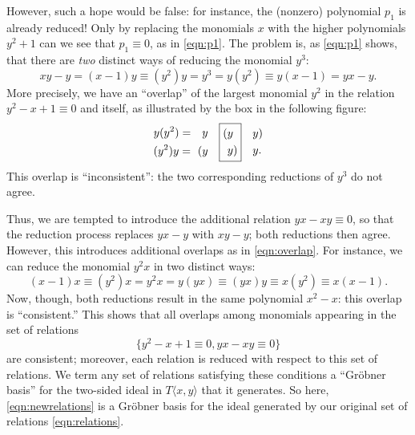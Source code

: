 However, such a hope would be false: for instance, the (nonzero) polynomial $p_1$ is already reduced! Only by replacing the monomials $x$ with the higher polynomials $y^2+1$ can we see that $p_1\equiv 0$, as in \eqref{eqn:p1}. The problem is, as \eqref{eqn:p1} shows, that there are \emph{two} distinct ways of reducing the monomial $y^3$:
\begin{equation*}
xy-y=(x-1)y\equiv (y^2)y=y^3=y(y^2)\equiv y(x-1)=yx-y.
\end{equation*}
More precisely, we have an ``overlap'' of the largest monomial $y^2$ in the relation $y^2-x+1\equiv 0$ and itself, as illustrated by the box in the following figure:
\begin{equation}
\label{eqn:overlap}
\begin{aligned}
y(y^2)=\quad&y\\
(y^2)y=\hspace{.35em}(&y
\end{aligned}
\quad
\boxed{\begin{aligned}
(&y\\
&y)
\end{aligned}}
\quad
\begin{aligned}
&y)\\
&y.
\end{aligned}
\end{equation}
This overlap is ``inconsistent'': the two corresponding reductions of $y^3$ do not agree.

Thus, we are tempted to introduce the additional relation $yx-xy\equiv 0$, so that the reduction process replaces $yx-y$ with $xy-y$; both reductions then agree. However, this introduces additional overlaps as in \eqref{eqn:overlap}. For instance, we can reduce the monomial $y^2x$ in two distinct ways:
\begin{equation*}
(x-1)x\equiv(y^2)x=y^2x=y(yx)\equiv(yx)y\equiv x(y^2)\equiv x(x-1).
\end{equation*}
Now, though, both reductions result in the same polynomial $x^2-x$: this overlap is ``consistent.'' This shows that all overlaps among monomials appearing in the set of relations
\begin{equation}
\label{eqn:newrelations}
\{y^2-x+1\equiv 0, yx-xy\equiv 0\}
\end{equation}
are consistent; moreover, each relation is reduced with respect to this set of relations. We term any set of relations satisfying these conditions a ``Gr\"obner basis'' for the two-sided ideal in $T\langle x,y\rangle$ that it generates. So here, \eqref{eqn:newrelations} is a Gr\"obner basis for the ideal generated by our original set of relations \eqref{eqn:relations}.


